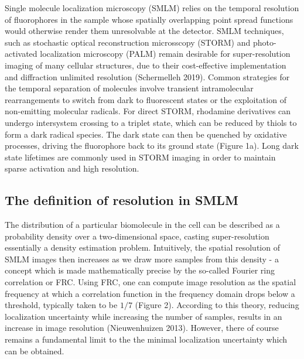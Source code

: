 \documentclass{ucetd}
\begin{document}
Single molecule localization microscopy (SMLM) relies on the temporal resolution of fluorophores in the sample whose spatially overlapping point spread functions would otherwise render them unresolvable at the detector. SMLM techniques, such as stochastic optical reconstruction microsscopy (STORM) and photo-activated localization microscopy (PALM) remain desirable for super-resolution imaging of many cellular structures, due to their cost-effective implementation and diffraction unlimited resolution (Schermelleh 2019). Common strategies for the temporal separation of molecules involve transient intramolecular rearrangements to switch from dark to fluorescent states or the exploitation of non-emitting molecular radicals. For direct STORM, rhodamine derivatives can undergo intersystem crossing to a triplet state, which can be reduced by thiols to form a dark radical species. The dark state can then be quenched by oxidative processes, driving the fluorophore back to its ground state (Figure 1a). Long dark state lifetimes are commonly used in STORM imaging in order to maintain sparse activation and high resolution.

\subsection{The definition of resolution in SMLM}

The distribution of a particular biomolecule in the cell can be described as a probability density over a two-dimensional space, casting super-resolution essentially a density estimation problem. Intuitively, the spatial resolution of SMLM images then increases as we draw more samples from this density - a concept which is made mathematically precise by the so-called Fourier ring correlation or FRC. Using FRC, one can compute image resolution as the spatial frequency at which a correlation function in the frequency domain drops below a threshold, typically taken to be $1/7$ (Figure 2). According to this theory, reducing localization uncertainty while increasing the number of samples, results in an increase in image resolution (Nieuwenhuizen 2013). However, there of course remains a fundamental limit to the the minimal localization uncertainty which can be obtained.
\end{document}
